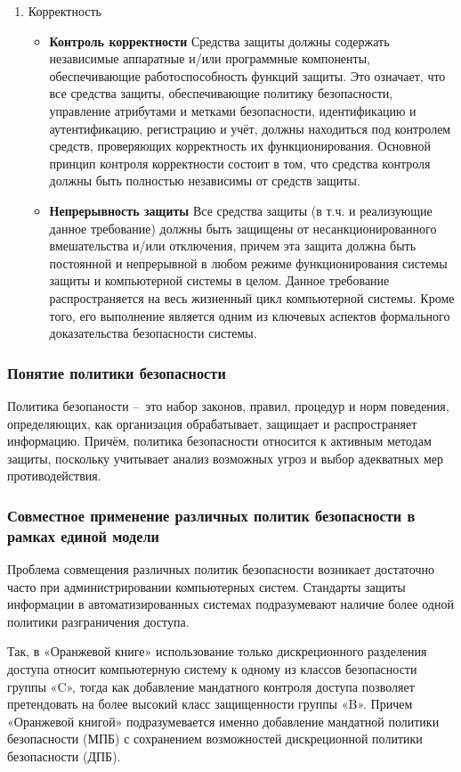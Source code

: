 \begin{enumerate}
	\item Корректность
	\begin{itemize}
		\item \textbf{Контроль корректности} Средства защиты должны содержать независимые аппаратные и/или программные компоненты, обеспечивающие работоспособность функций защиты. Это означает, что все средства защиты, обеспечивающие политику безопасности, управление атрибутами и метками безопасности, идентификацию и аутентификацию, регистрацию и учёт, должны находиться под контролем средств, проверяющих корректность их функционирования. Основной принцип контроля корректности состоит в том, что средства контроля должны быть полностью независимы от средств защиты.
		\item \textbf{Непрерывность защиты} Все средства защиты (в т.ч. и реализующие данное требование) должны быть защищены от несанкционированного вмешательства и/или отключения, причем эта защита должна быть постоянной и непрерывной в любом режиме функционирования системы защиты и компьютерной системы в целом. Данное требование распространяется на весь жизненный цикл компьютерной системы. Кроме того, его выполнение является одним из ключевых аспектов формального доказательства безопасности системы.
	\end{itemize}	
\end{enumerate}

\subsubsection{Понятие политики безопасности}
Политика безопаности -- это набор законов, правил, процедур и норм поведения, определяющих, как организация обрабатывает, защищает и распространяет информацию. Причём, политика безопасности относится к активным методам защиты, поскольку учитывает анализ возможных угроз и выбор адекватных мер противодействия.

\subsubsection{Совместное применение различных политик безопасности в рамках единой модели}
Проблема совмещения различных политик безопасности возникает достаточно часто при администрировании компьютерных систем. Стандарты защиты информации в автоматизированных системах подразумевают наличие более одной политики разграничения доступа. 

Так, в «Оранжевой книге» использование только дискреционного разделения доступа относит компьютерную систему к одному из классов безопасности группы «C», тогда как добавление мандатного контроля доступа позволяет претендовать на более высокий класс защищенности группы «B». Причем «Оранжевой книгой» подразумевается именно добавление мандатной политики безопасности (МПБ) с сохранением возможностей дискреционной политики безопасности (ДПБ).


